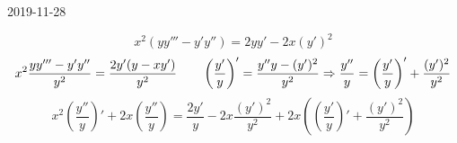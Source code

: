 \documentclass[12pt, fleqn]{article}
\begin{document}
\begin{lect}{2019-11-28}
    \begin{Task}[из дз]
        \[x^2(yy''' - y'y'') = 2yy' - 2x(y')^2\]
        \[x^2 \frac{yy''' - y'y''}{y^2} = \frac{2 y'(y - xy')}{y^2} \qquad \left(\frac{y'}{y}\right)' = 
        \frac{y''y - (y')^2}{y^2} \Rightarrow \frac{y''}{y} = \left(\frac{y'}{y}\right)' + \frac{(y')^2}{y^2}\]
        \[x^2 \left(\frac{y''}{y}\right)' + 2x \left(\frac{y''}{y}\right) = 
        \frac{2y'}{y} - 2x \frac{(y')^2}{y^2} + 2x \left(\left(\frac{y'}{y}\right)' + \frac{(y')^2}{y^2}\right)\]
    \end{Task}
\end{lect}
\end{document}
